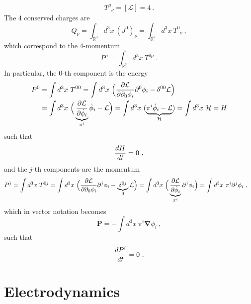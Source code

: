     \begin{equation*}
        T^\mu_{\phantom \mu \nu} = [\mathcal L] = 4 ~.
    \end{equation*}
    The $4$ conserved charges are 
    \begin{equation*}
        Q_\nu = \int_{\mathbb R^3} d^3 x ~ (J^0)_\nu = \int_{\mathbb R^3} d^3 x ~ T^0_{\phantom 0 \nu}  ~,
    \end{equation*}
    which correspond to the $4$-momentum
    \begin{equation*}
        P^\mu = \int_{\mathbb R^3} d^3 x ~ T^{0\mu} ~.
    \end{equation*}
    In particular, the $0$-th component is the energy 
    \begin{equation}\label{energ}
    \begin{aligned}
        P^0 & = \int d^3 x ~ T^{00} = \int d^3 x ~ \Big ( \frac{\partial\mathcal L}{\partial\partial_0 \phi_i} \partial^0 \phi_i - \delta^{0 0} \mathcal L \Big) \\ & = \int d^3 x ~ \Big ( \underbrace{\frac{\partial\mathcal L}{\partial\dot \phi_i}}_{\pi^i} \dot \phi_i - \mathcal L \Big ) = \int d^3 x ~ (\underbrace{\pi^i \dot \phi_i - \mathcal L}_{\mathcal H}) = \int d^3 x ~ \mathcal H = H
    \end{aligned}
    \end{equation}
    such that 
    \begin{equation*}
        \frac{dH}{dt} = 0 ~,
    \end{equation*} 
    and the $j$-th components are the momentum 
    \begin{equation}\label{momen}
    \begin{aligned}
        P^j & = \int d^3 x ~ T^{0j} = \int d^3 x ~ \Big ( \frac{\partial\mathcal L}{\partial\partial_0 \phi_i} \partial^j \phi_i - \underbrace{\delta^{0j}}_0 \mathcal L \Big)  = \int d^3 x ~ \Big ( \underbrace{\frac{\partial\mathcal L}{\partial\dot \phi_i}}_{\pi^i} \partial^j \phi_i \Big) = \int d^3 x ~ \pi^i \partial^j \phi_i ~,
    \end{aligned}
    \end{equation}
    which in vector notation becomes 
    \begin{equation*}
        \mathbf P = - \int d^3 x ~ \pi^i \boldsymbol \nabla \phi_i ~,
    \end{equation*}
    such that 
    \begin{equation*}
        \frac{dP^i}{dt} = 0 ~.
    \end{equation*}

\section{Electrodynamics}

